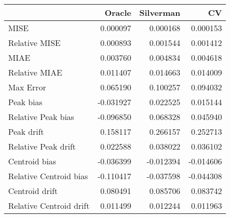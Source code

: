 \begin{tabular}{lrrr}
  \hline
 & Oracle & Silverman & CV \\ 
  \hline
MISE & 0.000097 & 0.000168 & 0.000153 \\ 
  Relative MISE & 0.000893 & 0.001544 & 0.001412 \\ 
  MIAE & 0.003760 & 0.004834 & 0.004618 \\ 
  Relative MIAE & 0.011407 & 0.014663 & 0.014009 \\ 
  Max Error & 0.065190 & 0.100257 & 0.094032 \\ 
  Peak bias & -0.031927 & 0.022525 & 0.015144 \\ 
  Relative Peak bias & -0.096850 & 0.068328 & 0.045940 \\ 
  Peak drift & 0.158117 & 0.266157 & 0.252713 \\ 
  Relative Peak drift & 0.022588 & 0.038022 & 0.036102 \\ 
  Centroid bias & -0.036399 & -0.012394 & -0.014606 \\ 
  Relative Centroid bias & -0.110417 & -0.037598 & -0.044308 \\ 
  Centroid drift & 0.080491 & 0.085706 & 0.083742 \\ 
  Relative Centroid drift & 0.011499 & 0.012244 & 0.011963 \\ 
   \hline
\end{tabular}

